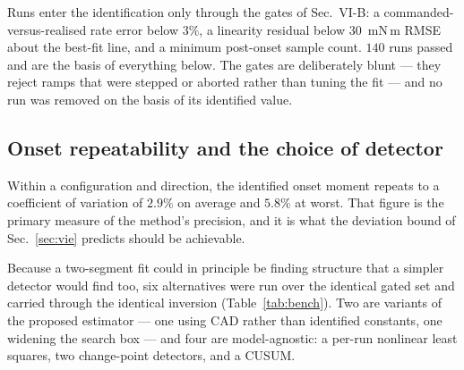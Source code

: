 Runs enter the identification only through the gates of Sec.~VI-B: a
commanded-versus-realised rate error below $3\%$, a linearity residual
below $30$~mN\,m RMSE about the best-fit line, and a minimum
post-onset sample count. $140$ runs passed and are the basis of
everything below. The gates are deliberately blunt --- they reject
ramps that were stepped or aborted rather than tuning the fit --- and
no run was removed on the basis of its identified value.

\subsection{Onset repeatability and the choice of detector}

Within a configuration and direction, the identified onset moment
repeats to a coefficient of variation of $2.9\%$ on average and
$5.8\%$ at worst. That figure is the primary measure of the method's
precision, and it is what the deviation bound of Sec.~\ref{sec:vie}
predicts should be achievable.

Because a two-segment fit could in principle be finding structure that
a simpler detector would find too, six alternatives were run over the
identical gated set and carried through the identical inversion
(Table~\ref{tab:bench}). Two are variants of the proposed estimator
--- one using CAD rather than identified constants, one widening the
search box --- and four are model-agnostic: a per-run nonlinear least
squares, two change-point detectors, and a CUSUM.


